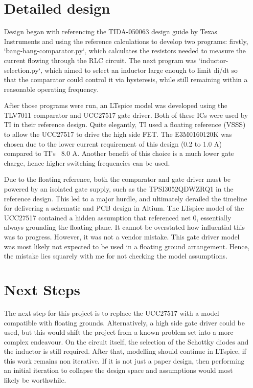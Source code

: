 \documentclass{article}
\begin{document}
\section{Detailed design}

Design began with referencing the TIDA-050063 design guide by Texas Instruments and using the reference calculations to develop two programs: firstly, `bang-bang-comparator.py`, which calculates the resistors needed to 
measure the current flowing through the RLC circuit. The next program was `inductor-selection.py`, which aimed to select an inductor large enough to limit di/dt so that the comparator could control it via hysteresis, 
while still remaining within a reasonable operating frequency.

\vspace{0.5cm}
After those programs were run, an LTspice model was developed using the TLV7011 comparator and UCC27517 gate driver. Both of these ICs were used by TI in their reference design. Quite elegantly, TI used a floating reference 
(VSSS) to allow the UCC27517 to drive the high side FET. The E3M0160120K was chosen due to the lower current requirement of this design (0.2 to 1.0 A) compared to TI's ~8.0 A. Another benefit of this choice is a much lower gate 
charge, hence higher switching frequencies can be used.

\vspace{0.5cm}
Due to the floating reference, both the comparator and gate driver must be powered by an isolated gate supply, such as the TPSI3052QDWZRQ1 in the reference design. This led to a major hurdle, and ultimately derailed the timeline 
for delivering a schematic and PCB design in Altium. The LTspice model of the UCC27517 contained a hidden assumption that referenced net 0, essentially always grounding the floating plane. It cannot be overstated how influential
 this was to progress. However, it was not a vendor mistake. This gate driver model was most likely not expected to be used in a floating ground arrangement. Hence, the mistake lies squarely with me for not checking the model assumptions. 

\section{Next Steps}
The next step for this project is to replace the UCC27517 with a model compatible with floating grounds. Alternatively, a high side gate driver could be used, but this would shift the project from a known problem set into a more 
complex endeavour. On the circuit itself, the selection of the Schottky diodes and the inductor is still required. After that, modelling should continue in LTspice, if this work remains non iterative. If it is not just a paper design, 
then performing an initial iteration to collapse the design space and assumptions would most likely be worthwhile. 
\end{document}
